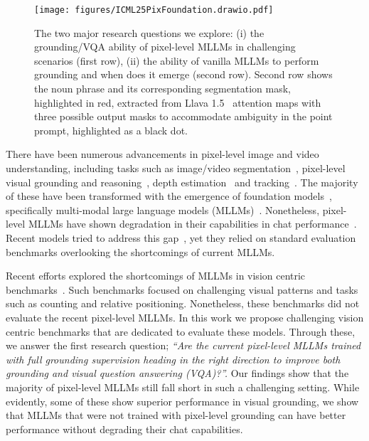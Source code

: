 
\begin{figure}[h]
\centering
    \texttt{[image: figures/ICML25PixFoundation.drawio.pdf]}
    \vspace{-1em}
    \caption{The two major research questions we explore: (i) the grounding/VQA ability of pixel-level MLLMs in challenging scenarios (first row), (ii) the ability of vanilla MLLMs to perform grounding and when does it emerge (second row). Second row shows the noun phrase and its corresponding segmentation mask, highlighted in red, extracted from Llava 1.5~\cite{liu2024improved} attention maps with three possible output masks to accommodate ambiguity in the point prompt, highlighted as a black dot.}
    \vspace{-1em}
    \label{fig:overview}
\end{figure}

There have been numerous advancements in pixel-level image and video understanding, including tasks such as image/video segmentation~\cite{zhou2022survey,minaee2021image,kirillov2023segment,ravi2024sam}, pixel-level visual grounding and reasoning~\cite{rasheed2024glamm,lai2024lisa}, depth estimation~\cite{yang2024depth} and tracking~\cite{wang2023tracking}. The majority of these have been transformed with the emergence of foundation models~\cite{bommasani2021opportunities}, specifically multi-modal large language models (MLLMs)~\cite{liu2024visual,dai2023instructblip}. Nonetheless, pixel-level MLLMs have shown degradation in their capabilities in chat performance~\cite{lai2024lisa}. Recent models tried to address this gap~\cite{zhang2024omg,zhang2025llava}, yet they relied on standard evaluation benchmarks overlooking the shortcomings of current MLLMs.

Recent efforts explored the shortcomings of MLLMs in vision centric benchmarks~\cite{tong2024eyes,tong2024cambrian}. Such benchmarks focused on challenging visual patterns and tasks such as counting and relative positioning. Nonetheless, these benchmarks did not evaluate the recent pixel-level MLLMs. In this work we propose challenging vision centric benchmarks that are dedicated to evaluate these models. Through these, we answer the first research question; \textit{``Are the current pixel-level MLLMs trained with full grounding supervision heading in the right direction to improve both grounding and visual question answering (VQA)?''.} Our findings show that the majority of pixel-level MLLMs still fall short in such a challenging setting. While evidently, some of these show superior performance in visual grounding, we show that MLLMs that were not trained with pixel-level grounding can have better performance without degrading their chat capabilities.


